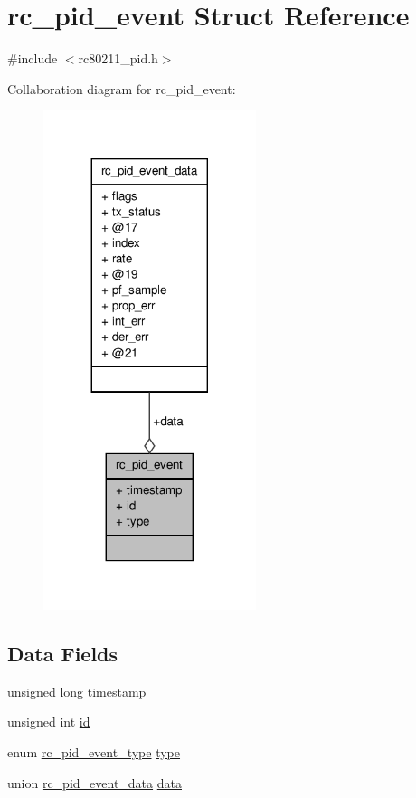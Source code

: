 \hypertarget{structrc__pid__event}{\section{rc\-\_\-pid\-\_\-event Struct Reference}
\label{structrc__pid__event}
}


{\ttfamily \#include $<$rc80211\-\_\-pid.\-h$>$}



Collaboration diagram for rc\-\_\-pid\-\_\-event\-:
\nopagebreak
\begin{figure}[H]
\begin{center}
\leavevmode
\includegraphics[width=176pt]{structrc__pid__event__coll__graph}
\end{center}
\end{figure}
\subsection*{Data Fields}
\begin{DoxyCompactItemize}
\item 
unsigned long \hyperlink{structrc__pid__event_acba7776dcc1861edfe0e9c5736de4df8}{timestamp}
\item 
unsigned int \hyperlink{structrc__pid__event_ab7ce6f462afaf105224b0ca772a33c43}{id}
\item 
enum \hyperlink{rc80211__pid_8h_a636dd9c3283aad52c197c570e1def90a}{rc\-\_\-pid\-\_\-event\-\_\-type} \hyperlink{structrc__pid__event_ad5d1f941fce20a7c87ff35faaf354710}{type}
\item 
union \hyperlink{unionrc__pid__event__data}{rc\-\_\-pid\-\_\-event\-\_\-data} \hyperlink{structrc__pid__event_ad7906c836bd8f9691c05d7b1754e059c}{data}
\end{DoxyCompactItemize}



